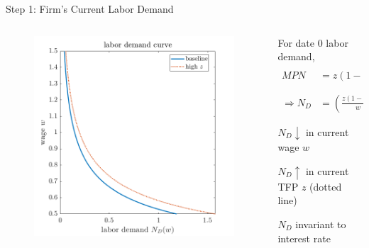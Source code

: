 \documentclass[11pt,aspectratio=169,usenames,dvipsnames]{beamer}
\let\tempone\itemize
\let\temptwo\enditemize
\renewenvironment{itemize}{\tempone\addtolength{\itemsep}{\fill}}{\temptwo}
\begin{document}
\begin{frame}{Step 1: Firm's Current Labor Demand}
\label{slide:Step_1__Firm_s_Current_Labor_Demand}
    \begin{columns}
        \begin{column}{0.5\textwidth}
            \begin{figure}
                \includegraphics[width=\textwidth]{./figures/LaborDemandTFP.png}
            \end{figure}
        \end{column}
        \begin{column}{0.5\textwidth}
            For date 0 labor demand,
            \begin{align*}
                MPN
                    & = z ( 1-\alpha ) \left(
                        \frac{K}{ N_{D}}
                    \right)^{\alpha} = w
                \\
                \Rightarrow N_{D}
                    & = \left(
                        \frac{z ( 1-\alpha )}{w}
                    \right)^{\frac{1}{\alpha}} K
            \end{align*}
            \begin{itemize}
                \item $ N_{D} \downarrow $ in current wage $ w $
                \item $ N_{D} \uparrow  $ in current TFP $ z $ (dotted line)
                \item $ N_{D} $ invariant to interest rate
            \end{itemize}
        \end{column}
    \end{columns}
\end{frame}
\end{document}
